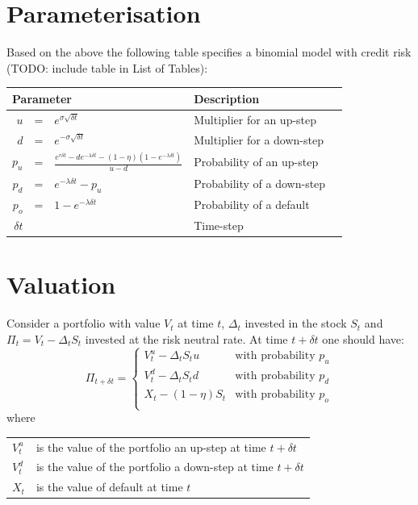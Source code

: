 \documentclass[a4paper,11pt,oneside]{report}
\theoremstyle{plain}
\theoremstyle{definition}
\def\S{\ensuremath{S_t}\xspace}
\def\Dt{\ensuremath{\delta t}\xspace}
\def\u{\ensuremath{u}\xspace}
\def\d{\ensuremath{d}\xspace}
\def\o{\ensuremath{o}\xspace}
\def\pu{\ensuremath{p_\u}\xspace}
\def\pd{\ensuremath{p_\d}\xspace}
\def\po{\ensuremath{p_\o}\xspace}
\def\V{\ensuremath{V_t}\xspace}
\def\Vu{\ensuremath{V^{u}_t}\xspace}
\def\Vd{\ensuremath{V^{d}_t}\xspace}
\def\X{\ensuremath{X_t}\xspace}
\def\P{\ensuremath{\Pi_t}\xspace}
\def\D{\ensuremath{\Delta_t}\xspace}
\begin{document}
\section{Parameterisation}
Based on the above the following table specifies a binomial model with credit risk (TODO: include table in List of Tables):

\begin{center}\begin{tabular}{|rcl|l|l|}\hline
 \multicolumn{3}{|l|}{\textbf{Parameter}} & \textbf{Description} \\\hline
 \u     &=& $e^{\sigma\sqrt{\Dt}}$ &
    Multiplier for an up-step \\\hline
 \d     &=& $e^{-\sigma\sqrt{\Dt}}$ &
    Multiplier for a down-step \\\hline
 \pu    &=& $\frac{e^{r\Dt} - \d e^{-\lambda\Dt} - (1 - \eta)(1 - e^{-\lambda\Dt})}{\u - \d}$ &
    Probability of an up-step \\\hline
 \pd    &=& $e^{-\lambda\Dt} - \pu$ &
    Probability of a down-step \\\hline
 \po    &=& $1 - e^{-\lambda\Dt}$ &
    Probability of a default \\\hline
 \Dt    & & &
    Time-step \\ \hline
\end{tabular}\end{center}

\section{Valuation}
Consider a portfolio with value \V at time $t$, \D invested in the stock \S and $\P = \V - \D\S$ invested at the risk neutral rate.  At time $t + \Dt$ one should have:
\begin{equation*}
 \Pi_{t + \Dt} =
 \begin{cases}
  \Vu - \D\S u          & \text{with probability } \pu \\
  \Vd - \D\S d          & \text{with probability } \pd\\
  \X - (1 - \eta)\S     & \text{with probability } \po\\
 \end{cases}
\end{equation*}
where

\begin{tabular}{ll}
 $\Vu$          & is the value of the portfolio an up-step at time $t + \Dt$ \\
 $\Vd$          & is the value of the portfolio a down-step at time $t + \Dt$ \\
 $\X$           & is the value of default at time $t$ \\
\end{tabular}
\end{document}
